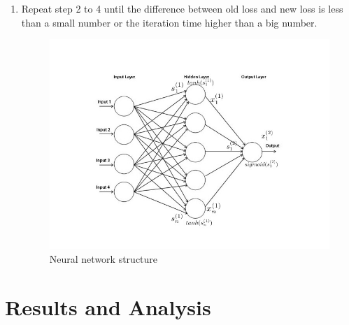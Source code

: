 \documentclass[conference]{IEEEtran}
\begin{document}
\begin{enumerate}
\item Repeat step 2 to 4 until the difference between old loss and new loss is less than a small number or the iteration time higher than a big number. \\
\begin{figure}[hb]
\centering
\includegraphics[scale=0.3]{nn.jpg}
\caption{Neural network structure}
\label{fig:nn}
\end{figure}
\end{enumerate}


\section{Results and Analysis} \label{result}
\end{document}
